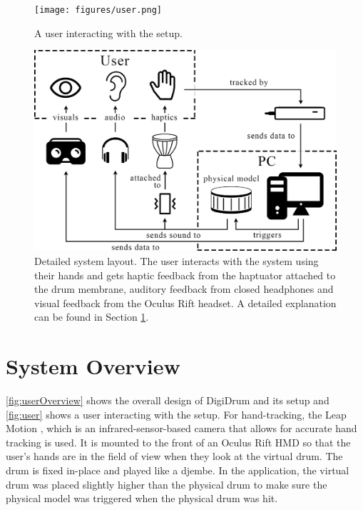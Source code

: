     \begin{figure}[t]
        \centering

    \texttt{[image: figures/user.png]}
    \caption{A user interacting with the setup.}
    \centering
    \label{fig:user}
    \end{figure}
    \begin{figure}[t]
        \centering

    \includegraphics[width=\paperFigWidth\textwidth]{figures/systemlayout-updated.png}
    \caption{Detailed system layout. The user interacts with the system using their hands and gets haptic feedback from the haptuator attached to the drum membrane, auditory feedback from closed headphones and visual feedback from the Oculus Rift headset. A detailed explanation can be found in Section \ref{sec:sys}.}
    \centering
    \label{fig:systemLayout}
    \end{figure}
    \section{System Overview} \label{sec:sys}
    
    \autoref{fig:userOverview} shows the overall design of DigiDrum and its setup and \autoref{fig:user} shows a user interacting with the setup. For hand-tracking, the Leap Motion \cite{leapwebsite}, which is an infrared-sensor-based camera that allows for accurate hand tracking is used. It is mounted to the front of an Oculus Rift HMD so that the user's hands are in the field of view when they look at the virtual drum. The drum is fixed in-place and played like a djembe. In the application, the virtual drum was placed slightly higher than the physical drum to make sure the physical model was triggered when the physical drum was hit.
    
